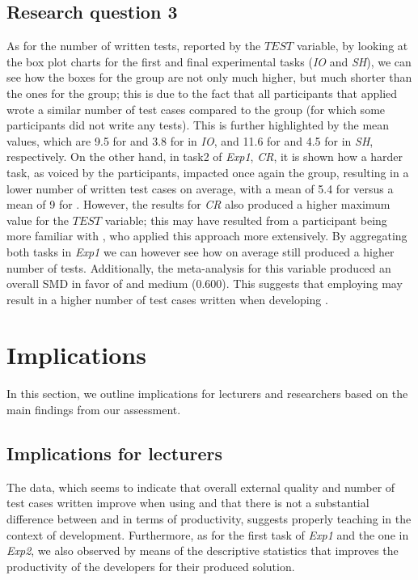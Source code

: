 \subsection{Research question 3}
As for the number of written tests, reported by the $TEST$ variable, by looking at the box plot charts for the first and final experimental tasks (\ie \textit{IO} and \textit{SH}), we can see how the boxes for the \tdd group are not only much higher, but much shorter than the ones for the \notdd group; this is due to the fact that all participants that applied \tdd wrote a similar number of test cases compared to the \notdd group (for which some participants did not write any tests).
This is further highlighted by the mean values, which are 9.5 for \tdd and 3.8 for \notdd in \textit{IO}, and 11.6 for \tdd and 4.5 for \notdd in \textit{SH}, respectively.
On the other hand, in task2 of \textit{Exp1}, \textit{CR}, it is shown how a harder task, as voiced by the participants, impacted once again the \tdd group, resulting in a lower number of written test cases on average, with a mean of 5.4 for \tdd versus a mean of 9 for \notdd. However, the results for \textit{CR} also produced a higher maximum value for the $TEST$ variable; this may have resulted from a participant being more familiar with \tdd, who applied this approach more extensively.
By aggregating both tasks in \textit{Exp1} we can however see how on average \tdd still produced a higher number of tests.
Additionally, the meta-analysis for this variable produced an overall SMD in favor of \tdd and medium (0.600).
This suggests that employing \tdd may result in a higher number of test cases written when developing \ess.





\section{Implications}
In this section, we outline implications for lecturers and researchers based on the main findings from our assessment. 

\subsection{Implications for lecturers}
The data, which seems to indicate that overall external quality and number of test cases written improve when using \tdd and that there is not a substantial difference between \tdd and \notdd in terms of productivity, suggests properly teaching \tdd in the context of \es development. Furthermore, as for the first task of \textit{Exp1} and the one in \textit{Exp2}, we also observed by means of the descriptive statistics that \tdd improves the productivity of the developers for their produced solution.

